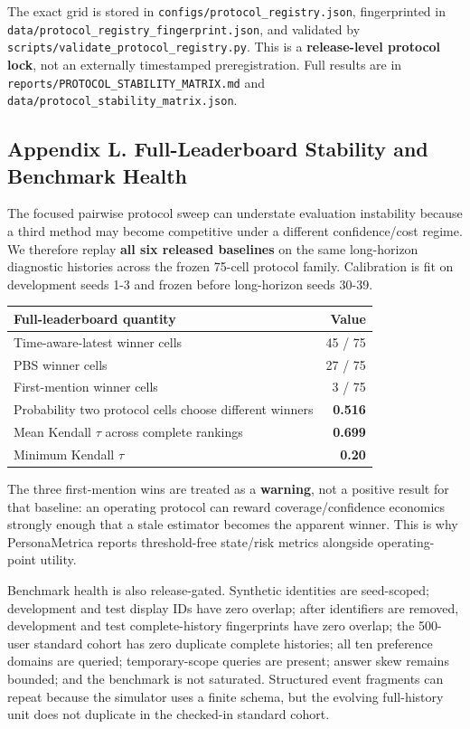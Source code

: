 The exact grid is stored in \texttt{configs/protocol\_registry.json},
fingerprinted in \texttt{data/protocol\_registry\_fingerprint.json}, and
validated by \texttt{scripts/validate\_protocol\_registry.py}. This is a
\textbf{release-level protocol lock}, not an externally timestamped
preregistration. Full results are in
\texttt{reports/PROTOCOL\_STABILITY\_MATRIX.md} and
\texttt{data/protocol\_stability\_matrix.json}.

\subsection{Appendix L. Full-Leaderboard Stability and Benchmark
Health}\label{appendix-l.-full-leaderboard-stability-and-benchmark-health}

The focused pairwise protocol sweep can understate evaluation
instability because a third method may become competitive under a
different confidence/cost regime. We therefore replay \textbf{all six
released baselines} on the same long-horizon diagnostic histories across
the frozen 75-cell protocol family. Calibration is fit on development
seeds 1-3 and frozen before long-horizon seeds 30-39.

\begin{longtable}[]{@{}lr@{}}
\toprule\noalign{}
Full-leaderboard quantity & Value \\
\midrule\noalign{}
\endhead
\bottomrule\noalign{}
\endlastfoot
Time-aware-latest winner cells & 45 / 75 \\
PBS winner cells & 27 / 75 \\
First-mention winner cells & 3 / 75 \\
Probability two protocol cells choose different winners &
\textbf{0.516} \\
Mean Kendall \(\tau\) across complete rankings & \textbf{0.699} \\
Minimum Kendall \(\tau\) & \textbf{0.20} \\
\end{longtable}

The three first-mention wins are treated as a \textbf{warning}, not a
positive result for that baseline: an operating protocol can reward
coverage/confidence economics strongly enough that a stale estimator
becomes the apparent winner. This is why PersonaMetrica reports
threshold-free state/risk metrics alongside operating-point utility.

Benchmark health is also release-gated. Synthetic identities are
seed-scoped; development and test display IDs have zero overlap; after
identifiers are removed, development and test complete-history
fingerprints have zero overlap; the 500-user standard cohort has zero
duplicate complete histories; all ten preference domains are queried;
temporary-scope queries are present; answer skew remains bounded; and
the benchmark is not saturated. Structured event fragments can repeat
because the simulator uses a finite schema, but the evolving
full-history unit does not duplicate in the checked-in standard cohort.

